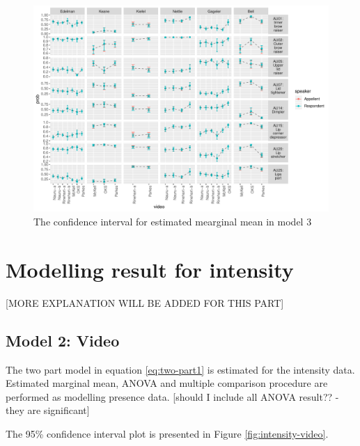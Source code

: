 \documentclass{monashthesis}
\begin{document}
\begin{figure}

{\centering \includegraphics[width=1\linewidth]{figures/model3-plot-1} 

}

\caption{The confidence interval for estimated mearginal mean in model 3}\label{fig:model3-plot}
\end{figure}

\newpage

\hypertarget{modelling-result-for-intensity}{%
\section{Modelling result for intensity}\label{modelling-result-for-intensity}}

{[}MORE EXPLANATION WILL BE ADDED FOR THIS PART{]}

\hypertarget{model-2-video-2}{%
\subsection{Model 2: Video}\label{model-2-video-2}}

The two part model in equation \ref{eq:two-part1} is estimated for the intensity data. Estimated marginal mean, ANOVA and multiple comparison procedure are performed as modelling presence data. {[}should I include all ANOVA result?? - they are significant{]}

The 95\% confidence interval plot is presented in Figure \ref{fig:intensity-video}.
\end{document}
